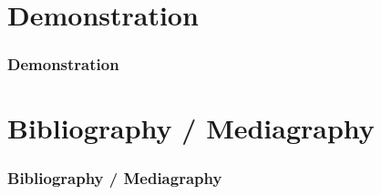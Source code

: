 \documentclass{beamer}
\begin{document}
\def\titleSectionFifthPart{Demonstration}
\section{\titleSectionFifthPart }
\begin{frame}
	\frametitle{\titleSectionFifthPart }
	\tableofcontents[sections=5,currentsection,subsectionstyle=show/shaded/hide]
\end{frame} 

\def\sectionPartBibliographie{Bibliography / Mediagraphy}
\section{\sectionPartBibliographie}
\begin{frame}
	\frametitle{\sectionPartBibliographie}
	\nocite{*}
	
	
\end{frame}
\end{document}
